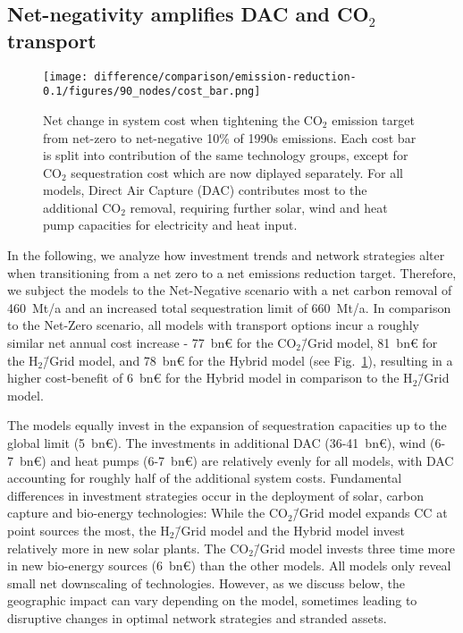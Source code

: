 \documentclass[twocolumn]{article}
\newcommand{\COtwo}{CO$_2$}
\newcommand{\modCO}{CO$_2$\=/Grid model}
\newcommand{\modH}{H$_2$\=/Grid model}
\newcommand{\modHybrid}{Hybrid model}
\newcommand{\carbon}{CO$_2$}
\newcommand{\carbonmodel}{CO$_2$\=/Grid model}
\newcommand{\hydrogenmodel}{H$_2$\=/Grid model}
\newcommand{\hybridmodel}{Hybrid model}
\begin{document}
\subsection*{Net-negativity amplifies DAC and \carbon{} transport}\label{subsec:NN}

\begin{figure}[htb!]
    \centering
    \texttt{[image: difference/comparison/emission-reduction-0.1/figures/90\_nodes/cost\_bar.png]}
    \caption[short]{Net change in system cost when tightening the \COtwo{} emission target from net-zero to net-negative 10\% of 1990s emissions. Each cost bar is split into contribution of the same technology groups, except for \carbon{} sequestration cost which are now diplayed separately. For all models, Direct Air Capture (DAC) contributes most to the additional \carbon{} removal, requiring further solar, wind and heat pump capacities for electricity and heat input.}
    \label{fig:net-negative_cost_bar}
\end{figure}


In the following, we analyze how investment trends and network strategies alter when transitioning from a net zero to a net emissions reduction target. Therefore, we subject the models to the Net-Negative scenario with a net carbon removal of 460~Mt/a and an increased total sequestration limit of 660~Mt/a. In comparison to the Net-Zero scenario, all models with transport options incur a roughly similar net annual cost increase - 77~bn€ for the \modCO{}, 81~bn€ for the \modH{}, and 78~bn€ for the \modHybrid{} (see Fig.~\ref{fig:net-negative_cost_bar}), resulting in a higher cost-benefit of 6~bn€ for the \hybridmodel{} in comparison to the \hydrogenmodel{}.

The models equally invest in the expansion of sequestration capacities up to the global limit (5~bn€). The investments in additional DAC (36-41~bn€), wind (6-7~bn€) and heat pumps (6-7~bn€) are relatively evenly for all models, with DAC accounting for roughly half of the additional system costs.
Fundamental differences in investment strategies occur in the deployment of solar, carbon capture and bio-energy technologies: While the \carbonmodel{} expands CC at point sources the most, the \hydrogenmodel{} and the \hybridmodel{} invest relatively more in new solar plants. The \carbonmodel{} invests three time more in new bio-energy sources (6~bn€) than the other models.
All models only reveal small net downscaling of technologies. However, as we discuss below, the geographic impact can vary depending on the model, sometimes leading to disruptive changes in optimal network strategies and stranded assets.
\end{document}
